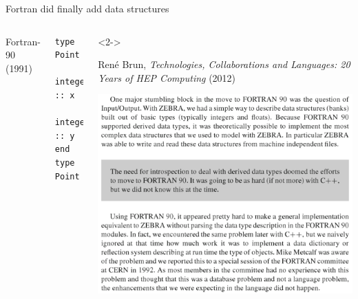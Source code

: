 \documentclass[aspectratio=169]{beamer}
\begin{document}
\begin{frame}[fragile]{Fortran did finally add data structures}
\vspace{0.25 cm}
\begin{columns}
{\large Fortran-90 (1991)}
\small
\begin{verbatim}
type Point
    integer :: x
    integer :: y
end type Point
\end{verbatim}
\vspace{2 cm}

\begin{uncoverenv}<2->

Ren\'e Brun, {\it Technologies, Collaborations and Languages: 20 Years of HEP Computing} (2012)

\vspace{0.25 cm}
\includegraphics[width=\linewidth]{PLOTS/brun-20-years-of-hep-computing.png}
\end{uncoverenv}
\end{columns}
\end{frame}
\end{document}

